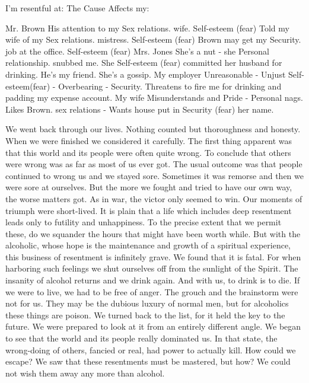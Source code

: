 \begin{biblechapter}
I'm resentful at:            The Cause                                    Affects my:

Mr. Brown 	His attention to my 	Sex relations.
 		wife. 	Self-esteem (fear) 
 	Told my wife of my 	Sex relations.
 		mistress. 	Self-esteem (fear)
 	Brown may get my  	Security.
 		job at the office. 	Self-esteem (fear)
Mrs. Jones 	She's a nut - she 	Personal relationship.
 		snubbed me. She 	Self-esteem (fear)
 		committed her husband 	
 		for drinking.
 		He's my friend.
 		She's a gossip.
My employer 	Unreasonable - Unjust 	Self-esteem(fear)
 		- Overbearing - 	Security.
 		Threatens to fire
 		me for drinking
 		and padding my expense
 		account.
My wife 	Misunderstands and 	Pride - Personal
 		nags. Likes Brown. 	sex  relations -
 		Wants house put in 	Security (fear)
 		her name.

We went back through our lives.  Nothing counted but thoroughness and honesty.  When we were finished we considered it carefully.  The first thing apparent was that this world and its people were often quite wrong.  To conclude that others were wrong was as far as most of us ever got.  The usual outcome was that people continued to wrong us and we stayed sore.  Sometimes it was remorse and then we were sore at ourselves.  But the more we fought and tried to have our own way, the worse matters got.  As in war, the victor only seemed to win.  Our moments of triumph were short-lived.
It is plain that a life which includes deep resentment leads only to futility and unhappiness.  To the precise extent that we permit these, do we squander the hours that might have been worth while.  But with the alcoholic, whose hope is the maintenance and growth of a spiritual experience, this business of resentment is infinitely grave.  We found that it is fatal.  For when harboring such feelings we shut ourselves off from the sunlight of the Spirit.  The insanity of alcohol returns and we drink again.  And with us, to drink is to die.
If we were to live, we had to be free of anger.  The grouch and the brainstorm were not for us.  They may be the dubious luxury of normal men, but for alcoholics these things are poison.
We turned back to the list, for it held the key to the future.  We were prepared to look at it from an entirely different angle.  We began to see that the world and its people really dominated us.  In that state, the wrong-doing of others, fancied or real, had power to actually kill.  How could we escape?  We saw that these resentments must be mastered, but how?  We could not wish them away any more than alcohol.

\end{biblechapter}

